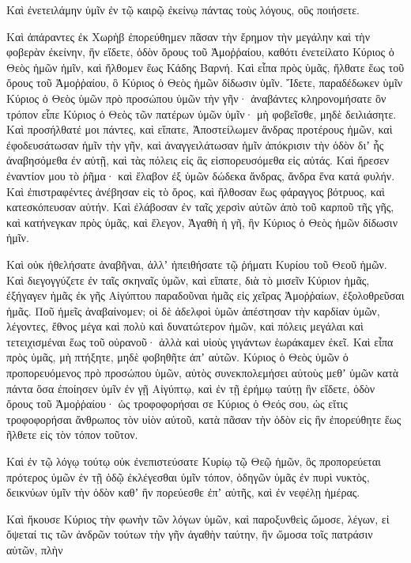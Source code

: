 {Καὶ ἐνετειλάμην ὑμῖν ἐν τῷ καιρῷ ἐκείνῳ πάντας τοὺς λόγους, οὓς ποιήσετε.
\par }{\PP {}Καὶ ἀπάραντες ἐκ Χωρὴβ ἐπορεύθημεν πᾶσαν τὴν ἔρημον τὴν μεγάλην καὶ τὴν φοβερὰν ἐκείνην, ἣν εἴδετε, ὁδὸν ὄρους τοῦ Ἀμοῤῥαίου, καθότι ἐνετείλατο Κύριος ὁ Θεὸς ἡμῶν ἡμῖν, καὶ ἤλθομεν ἕως Κάδης Βαρνή.
Καὶ εἶπα πρὸς ὑμᾶς, ἤλθατε ἕως τοῦ ὄρους τοῦ Ἀμοῤῥαίου, ὃ Κύριος ὁ Θεὸς ἡμῶν δίδωσιν ὑμῖν.
Ἴδετε, παραδέδωκεν ὑμῖν Κύριος ὁ Θεὸς ὑμῶν πρὸ προσώπου ὑμῶν τὴν γῆν· ἀναβάντες κληρονομήσατε ὃν τρόπον εἶπε Κύριος ὁ Θεὸς τῶν πατέρων ὑμῶν ὑμῖν· μὴ φοβεῖσθε, μηδὲ δειλιάσητε.
Καὶ προσήλθατέ μοι πάντες, καὶ εἴπατε, Ἀποστείλωμεν ἄνδρας προτέρους ἡμῶν, καὶ ἐφοδευσάτωσαν ἡμῖν τὴν γῆν, καὶ ἀναγγειλάτωσαν ἡμῖν ἀπόκρισιν τὴν ὁδὸν διʼ ἧς ἀναβησόμεθα ἐν αὐτῇ, καὶ τὰς πόλεις εἰς ἃς εἰσπορευσόμεθα εἰς αὐτάς.
Καὶ ἤρεσεν ἐναντίον μου τὸ ῥῆμα· καὶ ἔλαβον ἐξ ὑμῶν δώδεκα ἄνδρας, ἄνδρα ἕνα κατά φυλήν.
Καὶ ἐπιστραφέντες ἀνέβησαν εἰς τὸ ὄρος, καὶ ἤλθοσαν ἕως φάραγγος βότρυος, καὶ κατεσκόπευσαν αὐτήν.
Καὶ ἐλάβοσαν ἐν ταῖς χερσὶν αὐτῶν ἀπὸ τοῦ καρποῦ τῆς γῆς, καὶ κατήνεγκαν πρὸς ὑμᾶς, καὶ ἔλεγον, Ἀγαθὴ ἡ γῆ, ἣν Κύριος ὁ Θεὸς ἡμῶν δίδωσιν ἡμῖν.
\par }{\PP {}Καὶ οὐκ ἠθελήσατε ἀναβῆναι, ἀλλʼ ἠπειθήσατε τῷ ῥήματι Κυρίου τοῦ Θεοῦ ἡμῶν.
Καὶ διεγογγύζετε ἐν ταῖς σκηναῖς ὑμῶν, καὶ εἴπατε, διὰ τὸ μισεῖν Κύριον ἡμᾶς, ἐξήγαγεν ἡμᾶς ἐκ γῆς Αἰγύπτου παραδοῦναι ἡμᾶς εἰς χεῖρας Ἀμοῤῥαίων, ἐξολοθρεῦσαι ἡμᾶς.
Ποῦ ἡμεῖς ἀναβαίνομεν; οἱ δὲ ἀδελφοὶ ὑμῶν ἀπέστησαν τὴν καρδίαν ὑμῶν, λέγοντες, ἔθνος μέγα καὶ πολὺ καὶ δυνατώτερον ἡμῶν, καὶ πόλεις μεγάλαι καὶ τετειχισμέναι ἕως τοῦ οὐρανοῦ· ἀλλὰ καὶ υἱοὺς γιγάντων ἑωράκαμεν ἐκεῖ.
Καὶ εἶπα πρὸς ὑμᾶς, μὴ πτήξητε, μηδὲ φοβηθῆτε ἀπʼ αὐτῶν.
Κύριος ὁ Θεὸς ὑμῶν ὁ προπορευόμενος πρὸ προσώπου ὑμῶν, αὐτὸς συνεκπολεμήσει αὐτοὺς μεθʼ ὑμῶν κατὰ πάντα ὅσα ἐποίησεν ὑμῖν ἐν γῇ Αἰγύπτῳ,
καὶ ἐν τῇ ἐρήμῳ ταύτῃ ἣν εἴδετε, ὁδὸν ὄρους τοῦ Ἀμοῤῥαίου· ὡς τροφοφορήσαι σε Κύριος ὁ Θεός σου, ὡς εἴτις τροφοφορήσαι ἄνθρωπος τὸν υἱὸν αὐτοῦ, κατὰ πᾶσαν τὴν ὁδὸν εἰς ἣν ἐπορεύθητε ἕως ῆλθετε εἰς τὸν τόπον τοῦτον.
\par }{\PP {}Καὶ ἐν τῷ λόγῳ τούτῳ οὐκ ἐνεπιστεύσατε Κυρίῳ τῷ Θεῷ ἡμῶν,
ὃς προπορεύεται πρότερος ὑμῶν ἐν τῇ ὁδῷ ἐκλέγεσθαι ὑμῖν τόπον, ὁδηγῶν ὑμᾶς ἐν πυρὶ νυκτὸς, δεικνύων ὑμῖν τὴν ὁδὸν καθʼ ἣν πορεύεσθε ἐπʼ αὐτῆς, καὶ ἐν νεφέλῃ ἡμέρας.
\par }{\PP {}Καὶ ἤκουσε Κύριος τὴν φωνὴν τῶν λόγων ὑμῶν, καὶ παροξυνθεὶς ὤμοσε, λέγων,
εἰ ὄψεταί τις τῶν ἀνδρῶν τούτων τὴν γῆν ἀγαθὴν ταύτην, ἣν ὤμοσα τοῖς πατράσιν αὐτῶν, πλὴν
}
